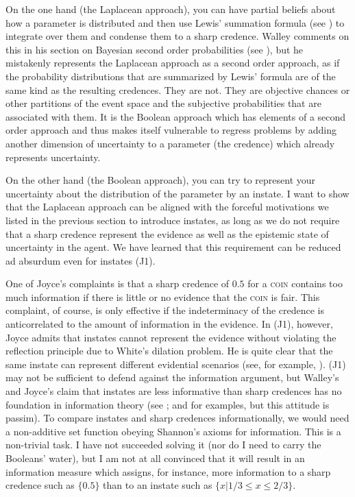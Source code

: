 \documentclass[11pt]{article}
\begin{document}
On the one hand (the Laplacean approach), you can have partial beliefs about how a parameter is distributed and then use Lewis' summation formula (see ) to integrate over them and condense them to a sharp credence. Walley comments on this  in his section on Bayesian second order probabilities (see ), but he mistakenly represents the Laplacean approach as a second order approach, as if the probability distributions that are summarized by Lewis' formula are of the same kind as the resulting credences. They are not. They are objective chances or other partitions of the event space and the subjective probabilities that are associated with them. It is the Boolean approach which has elements of a second order approach and thus makes itself vulnerable to regress problems by adding another dimension of uncertainty to a parameter (the credence) which already represents uncertainty.

On the other hand (the Boolean approach), you can try to represent your uncertainty about the distribution of the parameter by an instate. I want to show that the Laplacean approach can be aligned with the forceful motivations we listed in the previous section to introduce instates, as long as we do not require that a sharp credence represent the evidence as well as the epistemic state of uncertainty in the agent. We have learned that this requirement can be reduced ad absurdum even for instates (J1).

One of Joyce's complaints is that a sharp credence of $0.5$ for a \textsc{coin} contains too much information if there is little or no evidence that the \textsc{coin} is fair. This complaint, of course, is only effective if the indeterminacy of the credence is anticorrelated to the amount of information in the evidence. In (J1), however, Joyce admits that instates cannot represent the evidence without violating the reflection principle due to White's dilation problem. He is quite clear that the same instate can represent different evidential scenarios (see, for example, ). (J1) may not be sufficient to defend against the information argument, but Walley's and Joyce's claim that instates are less informative than sharp credences has no foundation in information theory (see ; and  for examples, but this attitude is passim). To compare instates and sharp credences informationally, we would need a non-additive set function obeying Shannon's axioms for information. This is a non-trivial task. I have not succeeded solving it (nor do I need to carry the Booleans' water), but I am not at all convinced that it will result in an information measure which assigns, for instance, more information to a sharp credence such as $\{0.5\}$ than to an instate such as $\{x|1/3\leq{}x\leq{}2/3\}$.
\end{document}
